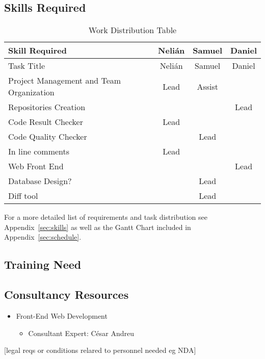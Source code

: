 
\subsection{Skills Required}
\begin{center}
\setlength{\extrarowheight}{1.5pt}
    \begin{longtable}{|m{3.25in}|c|c|c|}
 \caption{Work Distribution Table} \\
     \hline
    
    \centering Skill Required & Nelián & Samuel & Daniel \\
    \hline \hline \endfirsthead
    
         \hline

	\centering Task Title & Nelián & Samuel & Daniel \\    
	\hline \hline \endhead
    
    \endfoot    
    
    Project Management and Team Organization & Lead  & Assist &  \\ \hline
    Repositories Creation &       &       & Lead \\  \hline
    Code Result Checker & Lead  &       &  \\  \hline
    Code Quality Checker &       & Lead  &  \\  \hline
    In line comments & Lead  &       &  \\  \hline
    Web Front End &       &       & Lead \\  \hline
    Database Design? &       & Lead  &  \\  \hline
    Diff tool &       & Lead  &  \\  \hline
     \end{longtable}
\end{center}

For a more detailed list of requirements and task distribution see Appendix~\ref{sec:skills} as well as the Gantt Chart included in Appendix~\ref{sec:schedule}.

\subsection{Training Need}

\subsection{Consultancy Resources}
\begin{itemize}
\item Front-End Web Development
\begin{itemize}
\item Consultant Expert: César Andreu
\end{itemize}
\end{itemize}

[legal reqs or conditions relared to personnel needed eg NDA]